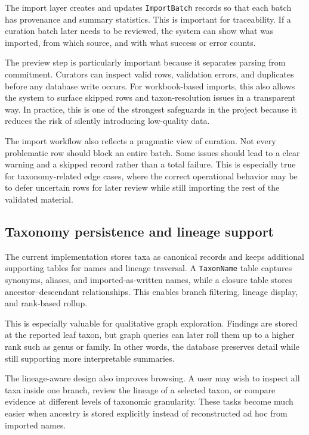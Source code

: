 The import layer creates and updates \texttt{ImportBatch} records so that each batch has provenance and summary statistics. This is important for traceability. If a curation batch later needs to be reviewed, the system can show what was imported, from which source, and with what success or error counts.

The preview step is particularly important because it separates parsing from commitment. Curators can inspect valid rows, validation errors, and duplicates before any database write occurs. For workbook-based imports, this also allows the system to surface skipped rows and taxon-resolution issues in a transparent way. In practice, this is one of the strongest safeguards in the project because it reduces the risk of silently introducing low-quality data.

The import workflow also reflects a pragmatic view of curation. Not every problematic row should block an entire batch. Some issues should lead to a clear warning and a skipped record rather than a total failure. This is especially true for taxonomy-related edge cases, where the correct operational behavior may be to defer uncertain rows for later review while still importing the rest of the validated material.

\subsection{Taxonomy persistence and lineage support}

The current implementation stores taxa as canonical records and keeps additional supporting tables for names and lineage traversal. A \texttt{TaxonName} table captures synonyms, aliases, and imported-as-written names, while a closure table stores ancestor--descendant relationships. This enables branch filtering, lineage display, and rank-based rollup.

This is especially valuable for qualitative graph exploration. Findings are stored at the reported leaf taxon, but graph queries can later roll them up to a higher rank such as genus or family. In other words, the database preserves detail while still supporting more interpretable summaries.

The lineage-aware design also improves browsing. A user may wish to inspect all taxa inside one branch, review the lineage of a selected taxon, or compare evidence at different levels of taxonomic granularity. These tasks become much easier when ancestry is stored explicitly instead of reconstructed ad hoc from imported names.

